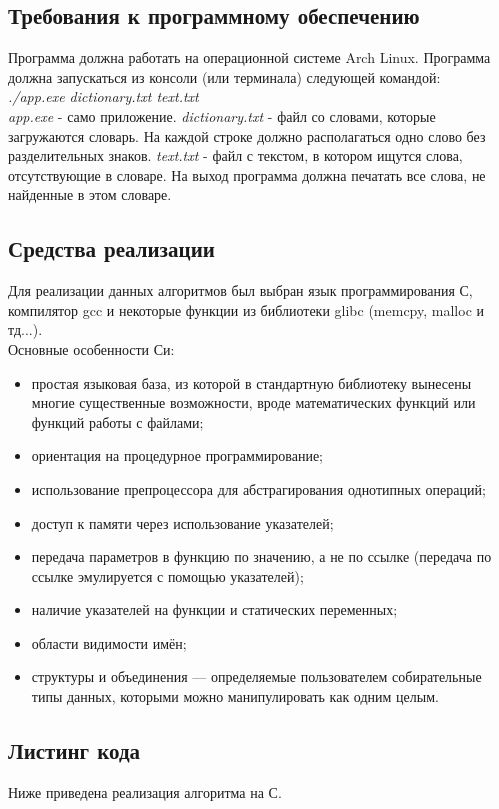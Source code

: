 \documentclass[a4paper,12pt]{article}
\begin{document}
\subsection{Требования к программному обеспечению}
Программа должна работать на операционной системе Arch Linux. 
Программа должна запускаться из консоли (или терминала) следующей командой:\\
\textit{./app.exe dictionary.txt text.txt} \\
\textit{app.exe} - само приложение. \textit{dictionary.txt} - файл со словами, которые загружаются словарь. На каждой строке должно располагаться одно слово без разделительных знаков. \textit{text.txt} - файл с текстом, в котором ищутся слова, отсутствующие в словаре.
На выход программа должна печатать все слова, не найденные в этом словаре.

\newpage
\subsection{Средства реализации}
Для реализации данных алгоритмов был выбран язык программирования С, компилятор gcc и некоторые функции из библиотеки glibc (memcpy, malloc и тд...). \\
Основные особенности Си: \\
\begin{itemize}
\item простая языковая база, из которой в стандартную библиотеку вынесены многие существенные возможности, вроде математических функций или функций работы с файлами;
\item ориентация на процедурное программирование;
\item использование препроцессора для абстрагирования однотипных операций;
\item доступ к памяти через использование указателей;
\item передача параметров в функцию по значению, а не по ссылке (передача по ссылке эмулируется с помощью указателей);
\item наличие указателей на функции и статических переменных;
\item области видимости имён;
\item структуры и объединения — определяемые пользователем собирательные типы данных, которыми можно манипулировать как одним целым.
\end{itemize}


\newpage
\subsection{Листинг кода}
Ниже приведена реализация алгоритма на С.\\


\end{document}

